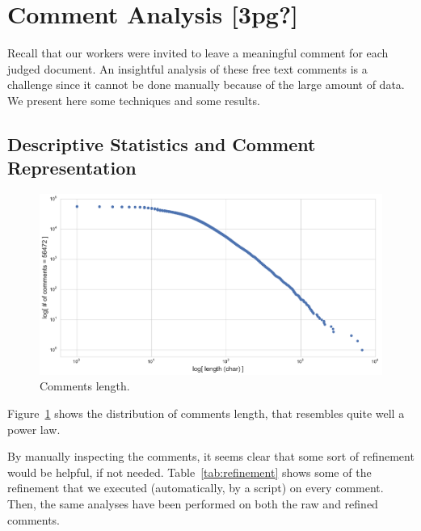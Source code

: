 
\section{Comment Analysis [3pg?]}
\label{sec:comment-analysis}


Recall that our workers were invited to leave a meaningful comment for
each judged document. 
An insightful analysis of these free text comments is a challenge
since it cannot be done manually because of the large amount of data.  
We present here some techniques and some results.

\subsection{Descriptive Statistics and Comment Representation}
\label{sec:descr-stat-1}

\begin{figure}[tp]
  \centering
  \includegraphics[width=.7\linewidth]{figs/CommentsLength.pdf}
  \caption{Comments length.
  \label{fig:CommentsLength}}
\end{figure}

Figure~\ref{fig:CommentsLength} shows the distribution of comments
length, that resembles quite well a power law.

By manually inspecting the comments, it seems clear that some sort of
refinement would be helpful, if not needed.
Table~\ref{tab:refinement} shows some of the refinement that we
executed (automatically, by a script) on every comment. 
Then, the same analyses have been performed on both the raw and
refined comments.

